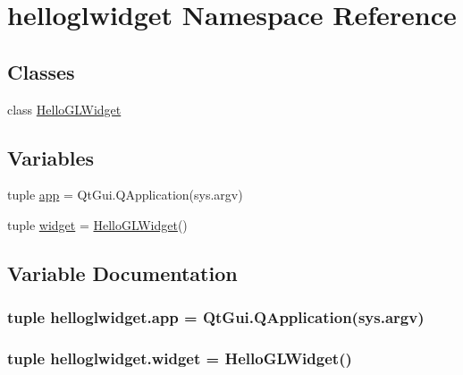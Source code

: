 \hypertarget{namespacehelloglwidget}{}\section{helloglwidget Namespace Reference}
\label{namespacehelloglwidget}
\subsection*{Classes}
\begin{DoxyCompactItemize}
\item 
class \hyperlink{classhelloglwidget_1_1HelloGLWidget}{Hello\+G\+L\+Widget}
\end{DoxyCompactItemize}
\subsection*{Variables}
\begin{DoxyCompactItemize}
\item 
tuple \hyperlink{namespacehelloglwidget_ac49d5bc02d0090de0e9547b781797818}{app} = Qt\+Gui.\+Q\+Application(sys.\+argv)
\item 
tuple \hyperlink{namespacehelloglwidget_a0a030d293fb83a2afe3f6409957ee9c5}{widget} = \hyperlink{classhelloglwidget_1_1HelloGLWidget}{Hello\+G\+L\+Widget}()
\end{DoxyCompactItemize}


\subsection{Variable Documentation}
\hypertarget{namespacehelloglwidget_ac49d5bc02d0090de0e9547b781797818}{}
\subsubsection[{app}]{\setlength{\rightskip}{0pt plus 5cm}tuple helloglwidget.\+app = Qt\+Gui.\+Q\+Application(sys.\+argv)}\label{namespacehelloglwidget_ac49d5bc02d0090de0e9547b781797818}
\hypertarget{namespacehelloglwidget_a0a030d293fb83a2afe3f6409957ee9c5}{}
\subsubsection[{widget}]{\setlength{\rightskip}{0pt plus 5cm}tuple helloglwidget.\+widget = {\bf Hello\+G\+L\+Widget}()}\label{namespacehelloglwidget_a0a030d293fb83a2afe3f6409957ee9c5}
